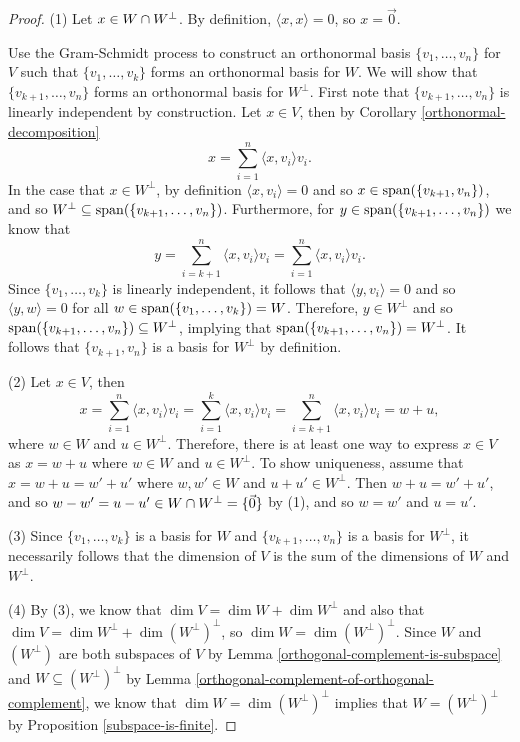 \begin{proof}\proofbreak
    (1) Let $x \in W \cap W^{\perp}$. By definition, $\langle x, x \rangle = 0$, so $x = \vec{0}$.

    Use the Gram-Schmidt process to construct an orthonormal basis $\{v_1, \ldots, v_n\}$ for $V$ such that $\{v_1, \ldots, v_k\}$ forms an orthonormal basis for $W$. We will show that $\{v_{k+1}, \ldots, v_n\}$ forms an orthonormal basis for $W^{\perp}$. First note that $\{v_{k+1}, \ldots, v_n\}$ is linearly independent by construction. Let $x \in V$, then by Corollary \ref{orthonormal-decomposition}
    \[x = \sum_{i=1}^{n}\langle x, v_i\rangle v_i.\] In the case that $x \in W^{\perp}$, by definition $\langle x, v_i\rangle = 0$ and so $x \in \operatorname{span}(\{v_{k+1}, v_n\})$, and so $W^{\perp} \subseteq \operatorname{span}(\{v_{k+1}, \ldots, v_n\})$. Furthermore, for $y \in \operatorname{span}(\{v_{k+1}, \ldots, v_n\})$ we know that \[y = \sum_{i={k+1}}^{n}\langle x, v_i\rangle v_i = \sum_{i=1}^{n}\langle x, v_i\rangle v_i.\] Since $\{v_1, \ldots, v_k\}$ is linearly independent, it follows that $\langle y, v_i \rangle = 0$ and so $\langle y, w \rangle = 0$ for all $w \in \operatorname{span}(\{v_1, \ldots, v_k\}) = W$. Therefore, $y \in W^{\perp}$ and so $\operatorname{span}(\{v_{k+1}, \ldots, v_n\}) \subseteq W^{\perp}$, implying that $\operatorname{span}(\{v_{k+1}, \ldots, v_n\}) = W^{\perp}$. It follows that $\{v_{k+1}, v_n\}$ is a basis for $W^{\perp}$ by definition.

    (2) Let $x \in V$, then \[x = \sum_{i=1}^{n}\langle x, v_i \rangle v_i = \sum_{i=1}^{k}\langle x, v_i \rangle v_i = \sum_{i={k+1}}^{n}\langle x, v_i \rangle v_i = w + u,\] where $w \in W$ and $u \in W^{\perp}$. Therefore, there is at least one way to express $x \in V$ as $x = w + u$ where $w \in W$ and $u \in W^{\perp}$. To show uniqueness, assume that $x = w + u = w' + u'$ where $w, w' \in W$ and $u + u' \in W^{\perp}$. Then $w + u = w' + u'$, and so $w - w' = u - u' \in W \cap W^{\perp} = \{\vec{0}\}$ by (1), and so $w = w'$ and $u = u'$.

    (3) Since $\{v_1, \ldots, v_k\}$ is a basis for $W$ and $\{v_{k+1}, \ldots, v_n\}$ is a basis for $W^{\perp}$, it necessarily follows that the dimension of $V$ is the sum of the dimensions of $W$ and $W^{\perp}$.

    (4) By (3), we know that $\dim V = \dim W + \dim W^{\perp}$ and also that $\dim V = \dim W^{\perp} + \dim\left(W^{\perp}\right)^{\perp}$, so $\dim W = \dim \left(W^{\perp}\right)^{\perp}$. Since $W$ and $\left(W^{\perp}\right)$ are both subspaces of $V$ by Lemma \ref{orthogonal-complement-is-subspace} and $W \subseteq \left(W^{\perp}\right)^{\perp}$ by Lemma \ref{orthogonal-complement-of-orthogonal-complement}, we know that $\dim W = \dim \left(W^{\perp}\right)^{\perp}$ implies that $W = \left(W^{\perp}\right)^{\perp}$ by Proposition \ref{subspace-is-finite}.
\end{proof}

